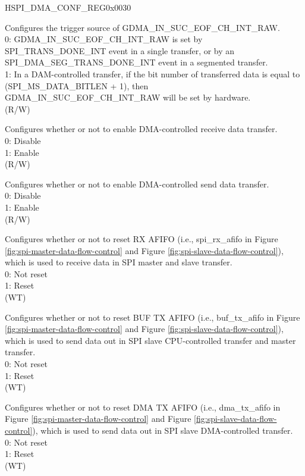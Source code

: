 \addtocounter{Regfloat}{-1}
\begin{register}{H}{SPI\_DMA\_CONF\_REG}{0x0030}
\begin{regdesc}\begin{reglist}
\item [Continued from the previous page...]
\label{fielddesc:SPIRXEOFEN}\item [SPI\_RX\_EOF\_EN] Configures the trigger source of GDMA\_IN\_SUC\_EOF\_CH\_INT\_RAW.\\
0: GDMA\_IN\_SUC\_EOF\_CH\_INT\_RAW is set by SPI\_TRANS\_DONE\_INT event in a single transfer, or by an SPI\_DMA\_SEG\_TRANS\_DONE\_INT event in a segmented transfer. \\
1: In a DAM-controlled transfer, if the bit number of transferred data is equal to (SPI\_MS\_DATA\_BITLEN + 1), then GDMA\_IN\_SUC\_EOF\_CH\_INT\_RAW will be set by hardware.\\
(R/W)
\label{fielddesc:SPIDMARXENA}\item [SPI\_DMA\_RX\_ENA] Configures whether or not to enable DMA-controlled receive data transfer.\\
0: Disable\\
1: Enable\\ 
(R/W)
\label{fielddesc:SPIDMATXENA}\item [SPI\_DMA\_TX\_ENA] Configures whether or not to enable DMA-controlled send data transfer.\\
0: Disable\\
1: Enable\\ 
(R/W)
\label{fielddesc:SPIRXAFIFORST}\item [SPI\_RX\_AFIFO\_RST] Configures whether or not to reset RX AFIFO (i.e., spi\_rx\_afifo in Figure \ref{fig:spi-master-data-flow-control} and Figure \ref{fig:spi-slave-data-flow-control}), which is used to receive data in SPI master and slave transfer.\\
0: Not reset\\
1: Reset \\
(WT)
\label{fielddesc:SPIBUFAFIFORST}\item [SPI\_BUF\_AFIFO\_RST] Configures whether or not to reset BUF TX AFIFO (i.e., buf\_tx\_afifo in Figure \ref{fig:spi-master-data-flow-control} and Figure \ref{fig:spi-slave-data-flow-control}), which is used to send data out in SPI slave CPU-controlled transfer and master transfer.\\
0: Not reset\\
1: Reset \\
(WT)
\label{fielddesc:SPIDMAAFIFORST}\item [SPI\_DMA\_AFIFO\_RST] Configures whether or not to reset DMA TX AFIFO (i.e., dma\_tx\_afifo in Figure \ref{fig:spi-master-data-flow-control} and Figure \ref{fig:spi-slave-data-flow-control}), which is used to send data out in SPI slave DMA-controlled transfer. \\
0: Not reset\\
1: Reset \\
(WT)
\end{reglist}\end{regdesc}
\end{register}


